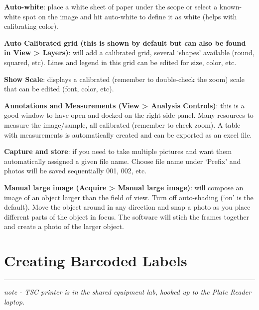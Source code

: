 \documentclass[
  letterpaper,
  DIV=11,
  numbers=noendperiod]{scrreprt}
\begin{document}
\textbf{Auto-white}: place a white sheet of paper under the scope or
select a known-white spot on the image and hit auto-white to define it
as white (helps with calibrating color).

\textbf{Auto Calibrated grid (this is shown by default but can also be
found in View \textgreater{} Layers)}: will add a calibrated grid,
several `shapes' available (round, squared, etc). Lines and legend in
this grid can be edited for size, color, etc.

\textbf{Show Scale}: displays a calibrated (remember to double-check the
zoom) scale that can be edited (font, color, etc).

\textbf{Annotations and Measurements (View \textgreater{} Analysis
Controls)}: this is a good window to have open and docked on the
right-side panel. Many resources to measure the image/sample, all
calibrated (remember to check zoom). A table with measurements is
automatically created and can be exported as an excel file.

\textbf{Capture and store}: if you need to take multiple pictures and
want them automatically assigned a given file name. Choose file name
under `Prefix' and photos will be saved sequentially 001, 002, etc.

\textbf{Manual large image (Acquire \textgreater{} Manual large image)}:
will compose an image of an object larger than the field of view. Turn
off auto-shading (`on' is the default). Move the object around in any
direction and snap a photo as you place different parts of the object in
focus. The software will stich the frames together and create a photo of
the larger object.

\hypertarget{creating-barcoded-labels}{%
\chapter{Creating Barcoded Labels}\label{creating-barcoded-labels}}

\begin{center}\rule{0.5\linewidth}{0.5pt}\end{center}

\emph{note - TSC printer is in the shared equipment lab, hooked up to
the Plate Reader laptop.}
\end{document}
